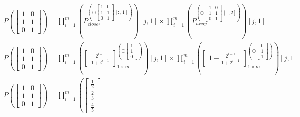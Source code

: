 \documentclass[letterpaper, 12pt]{report}
\begin{document}
\begin{align*}
	P\left(\begin{bmatrix}
			       1 & 0 \\ 1 & 1 \\ 0 & 1
		       \end{bmatrix}\right)=\prod_{i=1}^{m} \left(P_{closer}^{\left(\odot
		\begin{bmatrix}
			1 & 0 \\ 1 & 1 \\ 0 & 1
		\end{bmatrix}
		[:,1]\right)} \right)
	[j, 1]
	\times
	\prod_{i=1}^{m} \left( P_{away} ^{\left(\odot
		\begin{bmatrix}
			1 & 0 \\ 1 & 1 \\ 0 & 1
		\end{bmatrix}
		[:,2]\right)} \right)
	[j, 1]
	\\
	P\left(\begin{bmatrix}
			       1 & 0 \\ 1 & 1 \\ 0 & 1
		       \end{bmatrix}\right)=
	\prod_{i=1}^{m} \left(
	\begin{bmatrix}
		\frac{2^{i-1}}{1+2^{i-1}}
	\end{bmatrix}
	_{1{\times}m}
	^{\left(\odot
		\begin{bmatrix}
				1 \\ 1 \\ 0
			\end{bmatrix}
		\right)} \right)
	[j, 1]
	\times
	\prod_{i=1}^{m} \left(
	\begin{bmatrix}
		1- \frac{2^{i-1}}{1+2^{i-1}}
	\end{bmatrix}
	_{1{\times}m}
	^{ \left( \odot
		\begin{bmatrix}
				0 \\ 1 \\ 1
			\end{bmatrix}
		\right)} \right)
	[j, 1]
	\\
	P\left(\begin{bmatrix}
			       1 & 0 \\ 1 & 1 \\ 0 & 1
		       \end{bmatrix}\right)=
	\prod_{i=1}^{m} \left(
	\begin{bmatrix}
		\frac{1}{2} \\ \frac{2}{3} \\ \frac{4}{5}
	\end{bmatrix}

\end{align*}
\end{document}
